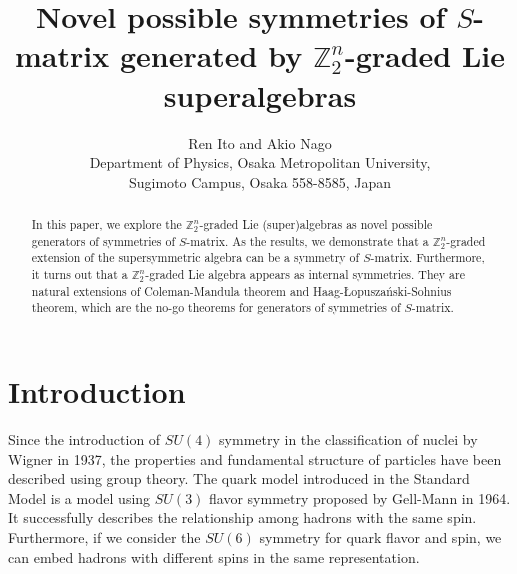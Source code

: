 \documentclass[a4paper,12pt]{article}
\def\Z{\mathbb{Z}}
\def\HLS{Haag-\L opusza\'nski-Sohnius }
\def\CM{Coleman-Mandula }
\theoremstyle{plain}
\theoremstyle{definition}
\begin{document}
\title{Novel possible  symmetries of $S$-matrix generated by $\Z_2^n$-graded Lie superalgebras}


\author{Ren Ito and Akio Nago
	\\[15pt]
	 Department of Physics, Osaka Metropolitan University,
\\Sugimoto Campus, Osaka 558-8585, Japan}


\maketitle

\vfill
\begin{abstract}
In this paper, we explore the $\Z_2^n$-graded Lie (super)algebras as novel possible generators of symmetries of $S$-matrix. 
As the results, 
we demonstrate that 
a $\Z_2^n$-graded extension of the supersymmetric algebra can be a symmetry of $S$-matrix. Furthermore, it turns out that a $\Z_2^n$-graded Lie algebra appears as internal symmetries.
They are natural extensions of \CM theorem and \HLS theorem, which are the no-go theorems for generators of symmetries of $S$-matrix. 
\end{abstract}





\section{Introduction}
Since the introduction of $SU(4)$ symmetry in the classification of nuclei by Wigner in 1937, the properties and fundamental structure of particles have been described using group theory\cite{F.J.D, S.W}.
The quark model introduced in the Standard Model is a model using $SU(3)$ flavor symmetry proposed by Gell-Mann in 1964\cite{M.G}. 
It successfully describes the relationship among hadrons with the same spin.
Furthermore, if we consider the $SU(6)$ symmetry for quark flavor and spin, we can embed  hadrons with different spins in the same representation. 
\end{document}
